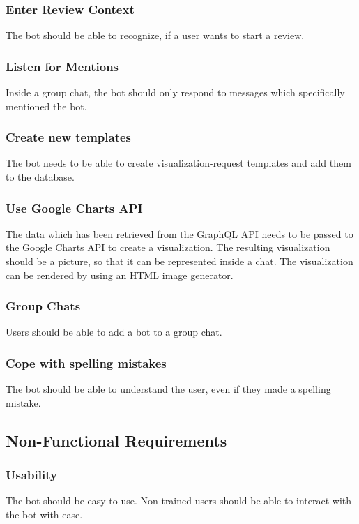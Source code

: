 
\subsubsection{Enter Review Context} The bot should be able to recognize, if a user wants to start a review.

\subsubsection{Listen for Mentions} Inside a group chat, the bot should only respond to messages which specifically mentioned the bot.

\subsubsection{Create new templates} The bot needs to be able to create visualization-request templates and add them to the database.

\subsubsection{Use Google Charts API} The data which has been retrieved from the GraphQL API needs to be passed to the Google Charts API to create a visualization. The resulting visualization should be a picture, so that it can be represented inside a chat. The visualization can be rendered by using an HTML image generator.

\subsubsection{Group Chats} Users should be able to add a bot to a group chat.

\subsubsection{Cope with spelling mistakes} The bot should be able to understand the user, even if they made a spelling mistake.

\subsection{Non-Functional Requirements}

\subsubsection{Usability} The bot should be easy to use. Non-trained users should be able to interact with the bot with ease.

